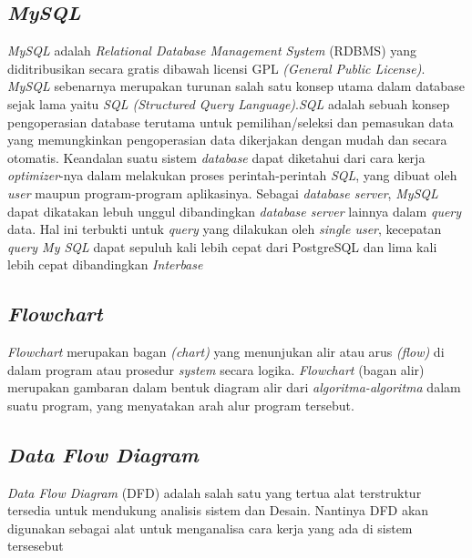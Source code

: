 \subsection{\textit{MySQL}}
\par
\textit{MySQL} adalah \textit{Relational Database Management System} (RDBMS) yang diditribusikan secara gratis dibawah licensi GPL \textit{(General Public License)}. \textit{MySQL} sebenarnya merupakan turunan salah satu konsep utama dalam database sejak lama yaitu \textit{SQL (Structured Query Language)}.\textit{SQL} adalah sebuah konsep pengoperasian database terutama untuk pemilihan/seleksi dan pemasukan data yang memungkinkan pengoperasian data dikerjakan dengan mudah dan secara otomatis. Keandalan suatu sistem \textit{database} dapat diketahui dari cara kerja \textit{optimizer}-nya dalam melakukan proses perintah-perintah \textit{SQL}, yang dibuat oleh \textit{user} maupun program-program aplikasinya. Sebagai \textit{database server}, \textit{MySQL} dapat dikatakan lebuh unggul dibandingkan \textit{database server} lainnya dalam \textit{query} data. Hal ini terbukti untuk \textit{query} yang dilakukan oleh \textit{single user}, kecepatan \textit{query My SQL} dapat sepuluh kali lebih cepat dari PostgreSQL dan lima kali lebih cepat dibandingkan \textit{Interbase} \cite{santi2015implementasi}

\subsection{\textit{Flowchart}}
\par
\textit{Flowchart} merupakan bagan \textit{(chart)} yang menunjukan alir atau arus \textit{(flow)} di dalam program atau prosedur \textit{system} secara logika. \textit{Flowchart} (bagan alir) merupakan gambaran dalam bentuk diagram alir dari \textit{algoritma-algoritma} dalam suatu program, yang menyatakan arah alur program tersebut.
\cite{solikin2018implementasi}

\subsection{\textit{Data Flow Diagram}}
\textit{Data Flow Diagram} (DFD) adalah salah satu yang tertua
alat terstruktur tersedia untuk mendukung analisis sistem dan
Desain. Nantinya DFD akan digunakan sebagai alat untuk menganalisa cara kerja yang ada di sistem tersesebut
 \cite{sauter2015making}
\par

